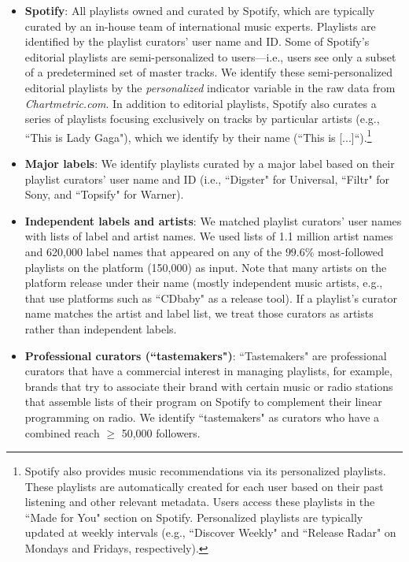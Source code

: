 \begin{itemize}
    \item \textbf{Spotify}: All playlists owned and curated by Spotify, which are typically curated by an in-house team of international music experts. Playlists are identified by the playlist curators' user name and ID. Some of Spotify's editorial playlists are semi-personalized to users---i.e., users see only a subset of a predetermined set of master tracks. We identify these semi-personalized editorial playlists by the \textit{personalized} indicator variable in the raw data from \textit{Chartmetric.com}. In addition to editorial playlists, Spotify also curates a series of playlists focusing exclusively on tracks by particular artists (e.g., ``This is Lady Gaga"), which we identify by their name (``This is [...]``).\footnote{Spotify also provides music recommendations via its personalized playlists. These playlists are automatically created for each user based on their past listening and other relevant metadata. Users access these playlists in the ``Made for You" section on Spotify. Personalized playlists are typically updated at weekly intervals (e.g., ``Discover Weekly" and ``Release Radar" on Mondays and Fridays, respectively).}%


    \item \textbf{Major labels}: We identify playlists curated by a major label based on their playlist curators' user name and ID (i.e., ``Digster" for Universal, ``Filtr" for Sony, and ``Topsify" for Warner).
    
    \item \textbf{Independent labels and artists}: We matched playlist curators' user names with lists of label and artist names. We used lists of 1.1 million artist names and 620,000 label names that appeared on any of the $99.6\%$ most-followed playlists on the platform (150,000) as input. Note that many artists on the platform release under their name (mostly independent music artists, e.g., that use platforms such as ``CDbaby" as a release tool). If a playlist's curator name matches the artist and label list, we treat those curators as artists rather than independent labels. 
    
     \item \textbf{Professional curators (``tastemakers")}: ``Tastemakers" are professional curators that have a commercial interest in managing playlists, for example, brands that try to associate their brand with certain music or radio stations that assemble lists of their program on Spotify to complement their linear programming on radio. We identify ``tastemakers" as curators who have a combined reach $\geq$ 50,000 followers.
     

\end{itemize}

